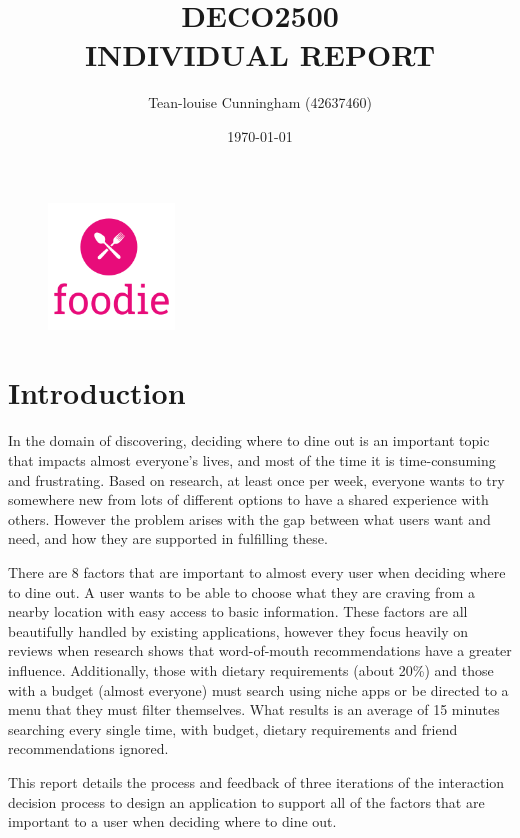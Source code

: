 \documentclass[a4 paper, 12pt]{article}
\title{DECO2500 \\ INDIVIDUAL REPORT}
\author{Tean-louise Cunningham (42637460)}
\date{\today}
\begin{document}
\maketitle
\begin{figure} [H]
    \centering
    \includegraphics[width=0.3\textwidth]
        {title.PNG} 
\end{figure}  

\pagebreak
\tableofcontents

\pagebreak
\section{Introduction}
In the domain of discovering, deciding where to dine out is an important topic that impacts almost everyone’s lives, and most of the time it is time-consuming and frustrating. Based on research, at least once per week, everyone wants to try somewhere new from lots of different options to have a shared experience with others. However the problem arises with the gap between what users want and need, and how they are supported in fulfilling these. 

There are 8 factors that are important to almost every user when deciding where to dine out. A user wants to be able to choose what they are craving from a nearby location with easy access to basic information. These factors are all beautifully handled by existing applications, however they focus heavily on reviews when research shows that word-of-mouth recommendations have a greater influence. Additionally, those with dietary requirements (about 20\%) and those with a budget (almost everyone) must search using niche apps or be directed to a menu that they must filter themselves. What results is an average of 15 minutes searching every single time, with budget, dietary requirements and friend recommendations ignored.

This report details the process and feedback of three iterations of the interaction decision process to design an application to support all of the factors that are important to a user when deciding where to dine out. 
\end{document}
